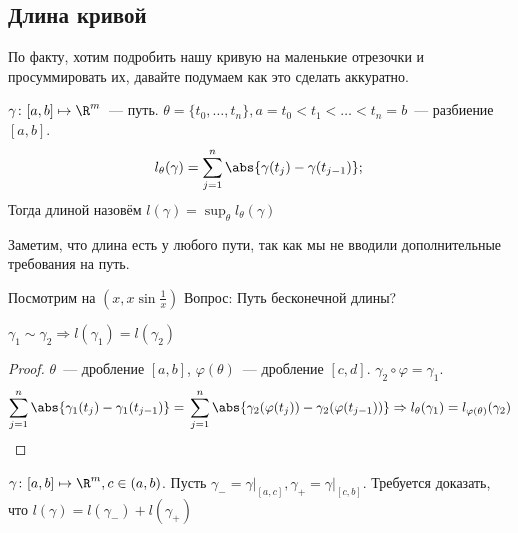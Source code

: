 \subsection{Длина кривой}
По факту, хотим подробить нашу кривую на маленькие отрезочки
и просуммировать их, давайте подумаем как это сделать аккуратно.\\
\quad
\begin{definition}
    $\gamma\colon [a, b]\mapsto \R^m$~--- путь.
    $\theta = \{t_0,\dots, t_n\}, a = t_0 < t_1 < \dots < t_n = b$~---
    разбиение $[a, b]$.
    \[
        l_\theta(\gamma) = \sum\limits_{j = 1}^{n} \abs{\gamma(t_j) - \gamma(t_{j - 1})};\\
    \]
    Тогда длиной назовём  $l(\gamma) = \sup_\theta l_\theta(\gamma)$
\end{definition}
\begin{remark}
    Заметим, что длина есть у любого пути, так как мы не вводили
    дополнительные требования на путь.
\end{remark}
\begin{remark}
    Посмотрим на $(x, x\sin \frac{1}{x})$
    Вопрос: Путь бесконечной длины?
\end{remark}
\begin{theorem}
    $\gamma_1 \sim \gamma_2\Rightarrow l(\gamma_1) = l(\gamma_2)$
\end{theorem}
\begin{proof}
    $\theta$~--- дробление $[a,b]$,
    $\varphi(\theta)$~--- дробление $[c,d]$.
    $\gamma_2\circ\varphi=\gamma_1$.
    \[
        \sum\limits_{j = 1}^{n}\abs{\gamma_1(t_j) - \gamma_1(t_{j-1})}=\\
        \sum\limits_{j=1}^{n}\abs{\gamma_2(\varphi(t_j))-\gamma_2(\varphi(t_{j-1}))}
        \Rightarrow
        l_{\theta}(\gamma_1) = l_{\varphi(\theta)}(\gamma_2)
    \]
\end{proof}
\begin{theorem}
    $\gamma\colon [a,b]\mapsto\R^m, c\in(a,b)$.
    Пусть $\gamma_{-}=\gamma\big|_{[a,c]}, \gamma_{+} = \gamma\big|_{[c,b]}$.
    Требуется доказать, что $l(\gamma)=l(\gamma_-) + l(\gamma_+)$
\end{theorem}
